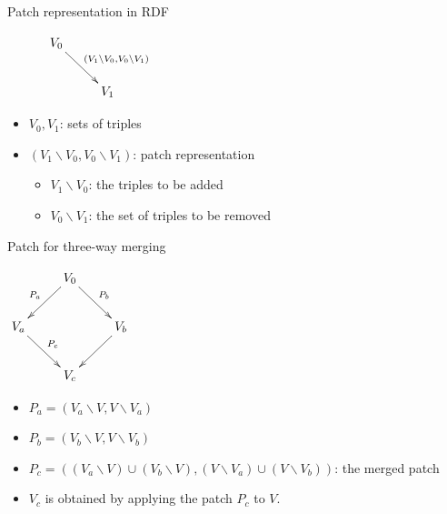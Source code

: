 \documentclass[dvips,slidetop,mathserif,brown]{beamer}
\begin{document}
\begin{frame}{Patch representation in RDF}
\begin{block}{}
	\begin{center}
		$\xymatrix{
			& V_0 \ar@{->}[dr]^-{(V_1\backslash V_0,V_0\backslash V_1)}   \\
			& & V_1 
		}$
	\end{center}
\end{block}
\begin{itemize}
	\item $V_0, V_1$: sets of triples
	\item $(V_1\backslash V_0,V_0\backslash V_1)$: patch representation
	\begin{itemize}
		\item $V_1\backslash V_0$: the triples to be added
		\item $V_0\backslash V_1$: the set of triples to be removed
	\end{itemize}
\end{itemize}
\end{frame}

\begin{frame}{Patch for three-way merging}
\begin{block}{}
	  \begin{center}
		$\xymatrix{
			& V_0 \ar@{->}[dr]^-{P_b}  
				\ar[dl]_-{P_a} \\
			V_a \ar[dr]^-{P_c} & & V_b \ar@{->}[dl]^-{} \\
			& V_c
		}$
	\end{center}
\end{block}
\begin{itemize}
	\item $P_a=(V_a\backslash V,V\backslash V_a)$ 
	\item $P_b=(V_b\backslash V,V\backslash V_b)$
	\item $P_c=( (V_a\backslash V)\cup(V_b\backslash V),
	(V\backslash V_a)\cup(V\backslash V_b))$: the merged patch
	\item $V_c$ is obtained by applying the patch $P_c$ to $V$.
\end{itemize}
\end{frame}
\end{document}
